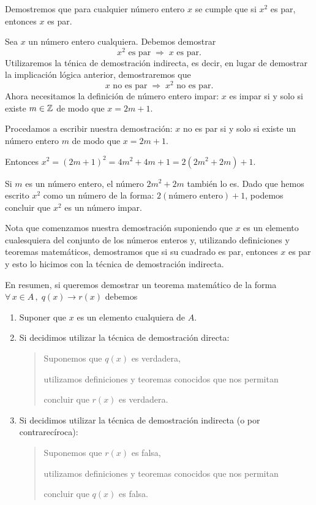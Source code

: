 \begin{ejemplo}
	Demostremos que para cualquier n\'umero entero $x$ se
	cumple que si $x^2$ es par, entonces $x$ es par.
	
	Sea $x$ un n\'umero entero cualquiera. Debemos demostrar
	\[
		x^2\mbox{ es par} \; \Rightarrow\; x \mbox{ es par}.
	\]	
	Utilizaremos la t\'enica de demostraci\'on indirecta, es
	decir, en lugar de demostrar la implicaci\'on l\'ogica anterior,
	demostraremos que 
	\[
		x\mbox{ no es par} \; \Rightarrow\; x^2 \mbox{ no es par}.
	\]
	Ahora necesitamos la definici\'on de n\'umero entero impar:
	$x$ es impar si y solo si existe $m\in \mathbb{Z}$ de modo que $x=2m+1$.
	
	Procedamos a escribir nuestra demostraci\'on:
	$x$ no es par si y solo si existe un n\'umero entero $m$ de modo que 
	$x = 2m+1$.
	
	Entonces $x^2 = (2m+1)^2 = 4m^2 + 4m + 1 = 2(2m^2 + 2m) + 1$.
	
	Si $m$ es un n\'umero entero, 
	el n\'umero $2m^2 + 2m$ tambi\'en
	lo es.
	Dado que hemos escrito 
	$x^2$ como un n\'umero de la forma: $2(\mbox{n\'umero entero}) + 1$,
	podemos concluir que $x^2$ es un n\'umero impar.
\end{ejemplo}

Nota que comenzamos nuestra demostraci\'on suponiendo que $x$ 
es un elemento cualesquiera del conjunto de los n\'umeros
enteros y, utilizando definiciones y teoremas matem\'aticos, demostramos que
si su cuadrado es par, entonces $x$ es par y esto lo hicimos
con la t\'ecnica de demostraci\'on indirecta.

En resumen, si queremos demostrar un teorema matem\'atico 
de la forma
$\forall\, x \in A\, ,\; q(x)\rightarrow r(x)$ debemos
\begin{enumerate}
	\item Suponer que $x$ es un elemento cualquiera de $A$.
	
	\medskip 
	
	\item Si decidimos utilizar la t\'ecnica de demostraci\'on directa:
		\begin{verse}
			Suponemos que $q(x)$ es verdadera,
			
			utilizamos definiciones y teoremas conocidos que
			nos permitan
			
			concluir que $r(x)$ es verdadera.
		\end{verse}
	
	\medskip 
	
	\item Si decidimos utilizar la t\'ecnica de demostraci\'on indirecta (o por contrarecíroca):
	\begin{verse}
		Suponemos que $r(x)$ es falsa,
		
		utilizamos definiciones y teoremas conocidos que
		nos permitan
		
		concluir que $q(x)$ es falsa.
	\end{verse}
\end{enumerate}

